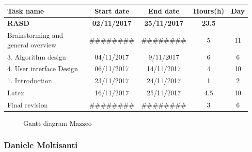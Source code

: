 \begin{table}[h!]
	\begin{tabular}{lcccc}
		\toprule
		\textbf{Task name} & \textbf{Start date} & \textbf{End date} & \textbf{Hours(h)} & \textbf{Day} \\
		\midrule
		\textbf{RASD} & \textbf{02/11/2017} & \textbf{25/11/2017} & \textbf{23.5} &  \\
		Brainstorming and general overview & \#\#\#\#\#\#\#\# & \#\#\#\#\#\#\#\# & 5 & 11 \\
		3. Algorithm design & 04/11/2017 & 9/11/2017 & 6 & 6 \\
		4. User interface Design & 06/11/2017 & 14/11/2017 & 4 & 10 \\
		1. Introduction & 23/11/2017 & 24/11/2017 & 1 & 2 \\
		Latex & 16/11/2017 & 25/11/2017 & 4.5 & 10 \\
		\bottomrule
		Final revision & \#\#\#\#\#\#\#\# & \#\#\#\#\#\#\#\# & 3 & 6 \\
	\end{tabular}
\end{table}

\begin{figure}[!h]
	\centering
	\caption{Gantt diagram Mazzeo}
\end{figure}
\clearpage

\subsubsection{Daniele Moltisanti}

